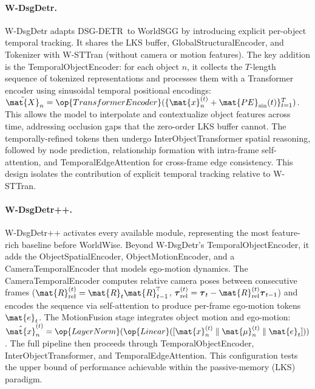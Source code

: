 \paragraph{W-DsgDetr.}
\label{par:wdsgdetr}
W-DsgDetr adapts DSG-DETR~to WorldSGG by introducing explicit per-object temporal tracking. It shares the LKS buffer, GlobalStructuralEncoder, and Tokenizer with W-STTran (without camera or motion features). The key addition is the TemporalObjectEncoder: for each object $n$, it collects the $T$-length sequence of tokenized representations and processes them with a Transformer encoder using sinusoidal temporal positional encodings: $\tilde{\mat{X}}_n = \op{TransformerEncoder}(\{\mat{x}_n^{(t)} + \mat{PE}_{\text{sin}}(t)\}_{t=1}^T)$. This allows the model to interpolate and contextualize object features across time, addressing occlusion gaps that the zero-order LKS buffer cannot. The temporally-refined tokens then undergo InterObjectTransformer spatial reasoning, followed by node prediction, relationship formation with intra-frame self-attention, and TemporalEdgeAttention for cross-frame edge consistency. This design isolates the contribution of explicit temporal tracking relative to W-STTran.

\paragraph{W-DsgDetr++.}
\label{par:wdsgdetrpp}
W-DsgDetr++ activates every available module, representing the most feature-rich baseline before WorldWise. Beyond W-DsgDetr's TemporalObjectEncoder, it adds the ObjectSpatialEncoder, ObjectMotionEncoder, and a CameraTemporalEncoder that models ego-motion dynamics. The CameraTemporalEncoder computes relative camera poses between consecutive frames ($\mat{R}_{\text{rel}}^{(t)} = \mat{R}_t\mat{R}_{t-1}^{\!\top}$, $\boldsymbol{\tau}_{\text{rel}}^{(t)} = \boldsymbol{\tau}_t - \mat{R}_{\text{rel}}^{(t)}\boldsymbol{\tau}_{t-1}$) and encodes the sequence via self-attention to produce per-frame ego-motion tokens $\mat{e}_t$. The MotionFusion stage integrates object motion and ego-motion: $\hat{\mat{x}}_n^{(t)} = \op{LayerNorm}(\op{Linear}([\mat{x}_n^{(t)} \;\|\; \mat{\mu}_n^{(t)} \;\|\; \mat{e}_t]))$. The full pipeline then proceeds through TemporalObjectEncoder, InterObjectTransformer, and TemporalEdgeAttention. This configuration tests the upper bound of performance achievable within the passive-memory (LKS) paradigm.

